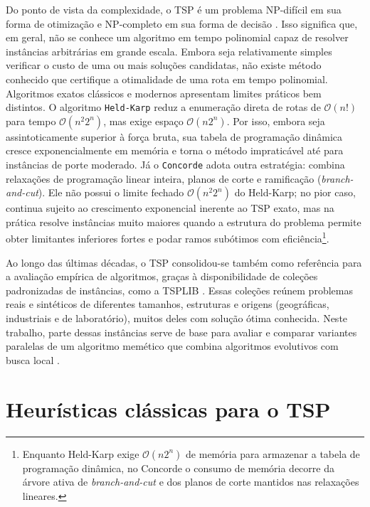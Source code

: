 Do ponto de vista da complexidade, o TSP é um problema NP-difícil em sua forma de otimização e NP-completo em sua forma de decisão \autocite{cook2012pursuit}.
Isso significa que, em geral, não se conhece um algoritmo em tempo polinomial capaz de resolver instâncias arbitrárias em grande escala.
Embora seja relativamente simples verificar o custo de uma ou mais soluções candidatas, não existe método conhecido que certifique a otimalidade de uma rota em tempo polinomial.
Algoritmos exatos clássicos e modernos apresentam limites práticos bem distintos.
O algoritmo \texttt{Held-Karp} \autocite{held1962dynamic} reduz a enumeração direta de rotas de \(\mathcal{O}(n!)\) para tempo \(\mathcal{O}(n^2 2^{n})\), mas exige espaço \(\mathcal{O}(n 2^{n})\).
Por isso, embora seja assintoticamente superior à força bruta, sua tabela de programação dinâmica cresce exponencialmente em memória e torna o método impraticável até para instâncias de porte moderado.
Já o \texttt{Concorde} \autocite{cook2012pursuit} adota outra estratégia: combina relaxações de programação linear inteira, planos de corte e ramificação (\emph{branch-and-cut}).
Ele não possui o limite fechado \(\mathcal{O}(n^2 2^{n})\) do Held-Karp; no pior caso, continua sujeito ao crescimento exponencial inerente ao TSP exato, mas na prática resolve instâncias muito maiores quando a estrutura do problema permite obter limitantes inferiores fortes e podar ramos subótimos com eficiência\footnote{Enquanto Held-Karp exige \(\mathcal{O}(n 2^{n})\) de memória para armazenar a tabela de programação dinâmica, no Concorde o consumo de memória decorre da árvore ativa de \emph{branch-and-cut} e dos planos de corte mantidos nas relaxações lineares.}.

Ao longo das últimas décadas, o TSP consolidou-se também como referência para a avaliação empírica de algoritmos, graças à disponibilidade de coleções padronizadas de instâncias, como a TSPLIB \autocite{reinelt1991tsplib}.
Essas coleções reúnem problemas reais e sintéticos de diferentes tamanhos, estruturas e origens (geográficas, industriais e de laboratório), muitos deles com solução ótima conhecida.
Neste trabalho, parte dessas instâncias serve de base para avaliar e comparar variantes paralelas de um algoritmo memético que combina algoritmos evolutivos com busca local \autocite{larranaga1999genetic,fujimoto2011highly}.

\section{Heurísticas clássicas para o TSP}\label{sec-22-heuristicas-tsp}

